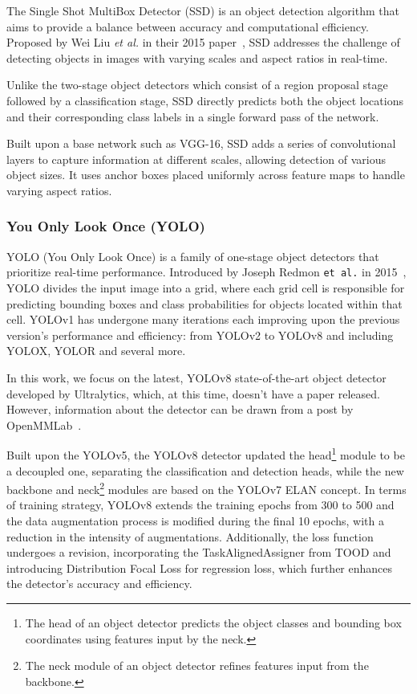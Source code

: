 The Single Shot MultiBox Detector (SSD) is an object detection algorithm that
aims to provide a balance between accuracy and computational efficiency.
Proposed by Wei Liu \textit{et al.} in their 2015 paper~\cite{Liu2015}, SSD
addresses the challenge of detecting objects in images with varying scales and
aspect ratios in real-time.

Unlike the two-stage object detectors which consist of a region proposal stage
followed by a classification stage, SSD directly predicts both the object
locations and their corresponding class labels in a single forward pass of the
network.

Built upon a base network such as VGG-16, SSD adds a series of convolutional
layers to capture information at different scales, allowing detection of various
object sizes. It uses anchor boxes placed uniformly across feature maps to
handle varying aspect ratios.

\subsubsection{You Only Look Once (YOLO)}

YOLO (You Only Look Once) is a family of one-stage object detectors that
prioritize real-time performance. Introduced by Joseph Redmon \texttt{et al.} in
2015~\cite{Redmon2015}, YOLO divides the input image into a grid, where each
grid cell is responsible for predicting bounding boxes and class probabilities
for objects located within that cell. YOLOv1 has undergone many iterations each
improving upon the previous version's performance and efficiency: from
YOLOv2 to YOLOv8 and including YOLOX, YOLOR and several more.

In this work, we focus on the latest, YOLOv8 state-of-the-art object
detector~\cite{YOLOv8} developed by Ultralytics, which, at this time, doesn't
have a paper released. However, information about the detector can be drawn from
a post by OpenMMLab~\cite{YOLOv8OpenMMLab}.

Built upon the YOLOv5, the YOLOv8 detector updated the head\footnote{The head of
an object detector predicts the object classes and bounding box coordinates
using features input by the neck.} module to be a decoupled one, separating the
classification and detection heads, while the new backbone and neck\footnote{The
neck module of an object detector refines features input from the backbone.}
modules are based on the YOLOv7 ELAN concept. In terms of training strategy,
YOLOv8 extends the training epochs from 300 to 500 and the data augmentation
process is modified during the final 10 epochs, with a reduction in the
intensity of augmentations. Additionally, the loss function undergoes a
revision, incorporating the TaskAlignedAssigner from TOOD and introducing
Distribution Focal Loss for regression loss, which further enhances
the detector's accuracy and efficiency.


